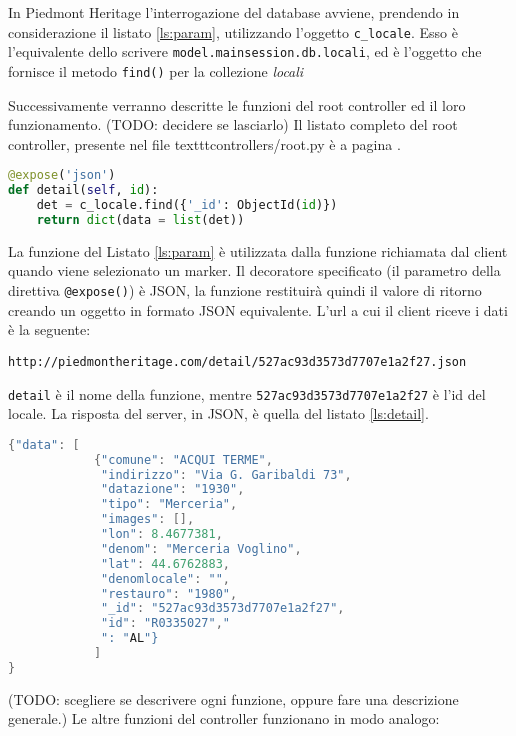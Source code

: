 In Piedmont Heritage l'interrogazione del database avviene, prendendo in considerazione il listato \ref{ls:param}, utilizzando l'oggetto \texttt{c\_locale}. Esso è l'equivalente dello scrivere \texttt{model.mainsession.db.locali}, ed è l'oggetto che fornisce il metodo \texttt{find()} per la collezione \emph{locali}


Successivamente verranno descritte le funzioni del root controller ed il loro funzionamento.
(TODO: decidere se lasciarlo) Il listato completo del root controller, presente nel file texttt{controllers/root.py} è a pagina \pageref{ls:completo}.

\begin{lstlisting}[label=ls:param,caption={Funzione utilizzata per richiedere i dettagli su un locale con ID=\texttt{id}},language=Python]
@expose('json')
def detail(self, id):
    det = c_locale.find({'_id': ObjectId(id)})
    return dict(data = list(det))
\end{lstlisting}

La funzione del Listato \ref{ls:param} è utilizzata dalla funzione richiamata dal client quando viene selezionato un marker. Il decoratore specificato (il parametro della direttiva \texttt{@expose()}) è JSON, la funzione restituirà quindi il valore di ritorno creando un oggetto in formato JSON equivalente. L'url a cui il client riceve i dati è la seguente:
\begin{lstlisting}
http://piedmontheritage.com/detail/527ac93d3573d7707e1a2f27.json
\end{lstlisting}
\texttt{detail} è il nome della funzione, mentre \texttt{527ac93d3573d7707e1a2f27} è l'id del locale. La risposta del server, in JSON, è quella del listato \ref{ls:detail}.

\begin{minipage}{\linewidth}
\begin{lstlisting}[label=ls:detail,caption={Dati in formato JSON restituiti dal server.},language=c]
{"data": [
    		{"comune": "ACQUI TERME",
    	 	 "indirizzo": "Via G. Garibaldi 73",
    	 	 "datazione": "1930",
    	 	 "tipo": "Merceria",
    	 	 "images": [],
    	 	 "lon": 8.4677381,
    	 	 "denom": "Merceria Voglino",
    	 	 "lat": 44.6762883,
    	 	 "denomlocale": "",
    	 	 "restauro": "1980",
    	 	 "_id": "527ac93d3573d7707e1a2f27",
    	 	 "id": "R0335027","
    	 	 ": "AL"}
    	    ]
}
\end{lstlisting}
\end{minipage}

(TODO: scegliere se descrivere ogni funzione, oppure fare una descrizione generale.)
Le altre funzioni del controller funzionano in modo analogo:

